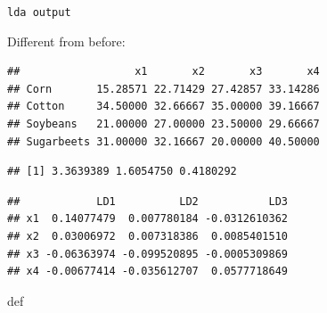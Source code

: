 \documentclass[ignorenonframetext,]{beamer}
\newenvironment{Shaded}{\begin{snugshade}}{\end{snugshade}}
\newcommand{\NormalTok}[1]{#1}
\newcommand{\OperatorTok}[1]{\textcolor[rgb]{0.81,0.36,0.00}{\textbf{#1}}}
\begin{document}
\begin{frame}[fragile]{\texttt{lda\ output}}
\protect\hypertarget{lda-output}{}

Different from before:

\begin{Shaded}
\end{Shaded}

\begin{verbatim}
##                  x1       x2       x3       x4
## Corn       15.28571 22.71429 27.42857 33.14286
## Cotton     34.50000 32.66667 35.00000 39.16667
## Soybeans   21.00000 27.00000 23.50000 29.66667
## Sugarbeets 31.00000 32.16667 20.00000 40.50000
\end{verbatim}

\begin{Shaded}
\end{Shaded}

\begin{verbatim}
## [1] 3.3639389 1.6054750 0.4180292
\end{verbatim}

\begin{Shaded}
\end{Shaded}

\begin{verbatim}
##            LD1          LD2           LD3
## x1  0.14077479  0.007780184 -0.0312610362
## x2  0.03006972  0.007318386  0.0085401510
## x3 -0.06363974 -0.099520895 -0.0005309869
## x4 -0.00677414 -0.035612707  0.0577718649
\end{verbatim}

def

\end{frame}
\end{document}

